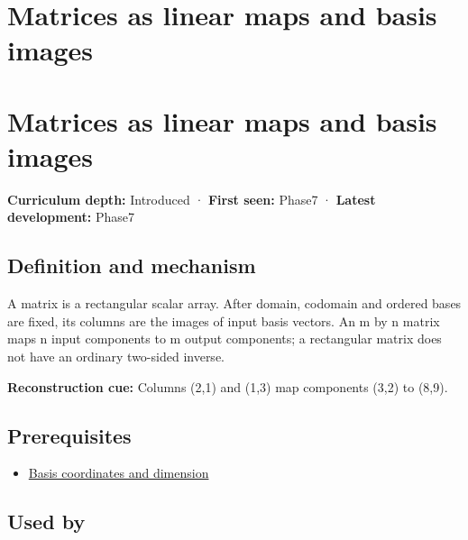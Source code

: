 \hypertarget{appendix-bd39c3bf5d64}{}
\section*{Matrices as linear maps and basis images}
\section{Matrices as linear maps and basis images}\label{appendix-bd39c3bf5d64-matrices-as-linear-maps-and-basis-images}

\textbf{Curriculum depth:} Introduced · \textbf{First seen:} Phase7 · \textbf{Latest development:} Phase7

\subsection{Definition and mechanism}\label{appendix-bd39c3bf5d64-definition-and-mechanism}

A matrix is a rectangular scalar array. After domain, codomain and ordered bases are fixed, its columns are the images of input basis vectors. An m by n matrix maps n input components to m output components; a rectangular matrix does not have an ordinary two-sided inverse.

\textbf{Reconstruction cue:} Columns (2,1) and (1,3) map components (3,2) to (8,9).

\subsection{Prerequisites}\label{appendix-bd39c3bf5d64-prerequisites}

\begin{itemize}
\tightlist
\item
  \hyperref[appendix-ce0341f7ea0d]{Basis coordinates and dimension}
\end{itemize}

\subsection{Used by}\label{appendix-bd39c3bf5d64-used-by}

